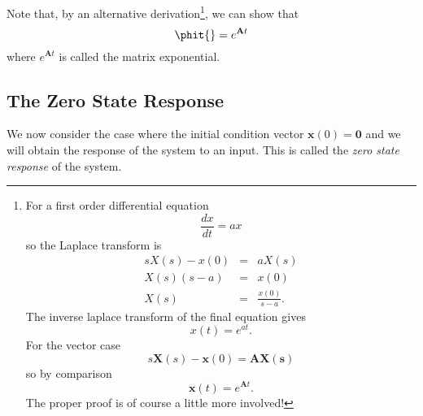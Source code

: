 Note that, by an alternative derivation\footnote{%
For a first order differential equation \[\frac{dx}{dt}=ax\] so
the Laplace transform is \begin{eqnarray*}sX(s) - x(0) & = &
aX(s)\\ X(s)(s - a)& = & x(0)\\ X(s)
&=&\frac{x(0)}{s-a}.\end{eqnarray*} The inverse laplace transform
of the final equation gives \[x(t) = e^{at}.\] For the vector case
\[s\mathbf{X}(s)-\mathbf{x}(0)=\mathbf{A}\mathbf{X(s)}\] so by comparison
\[\mathbf{x}(t)=e^{\mathbf{A} t}.\] The proper proof is of course
a little more involved!}, we can show that
\[\phit{}=e^{\mathbf{A}t}\] where $e^{\mathbf{A}t}$ is called the matrix exponential.

\subsection*{The Zero State Response}
We now consider the case where the initial condition vector
$\mathbf{x}(0)=\mathbf{0}$ and we will obtain the response of the
system to an input. This is called the \emph{zero state response}
of the system.


